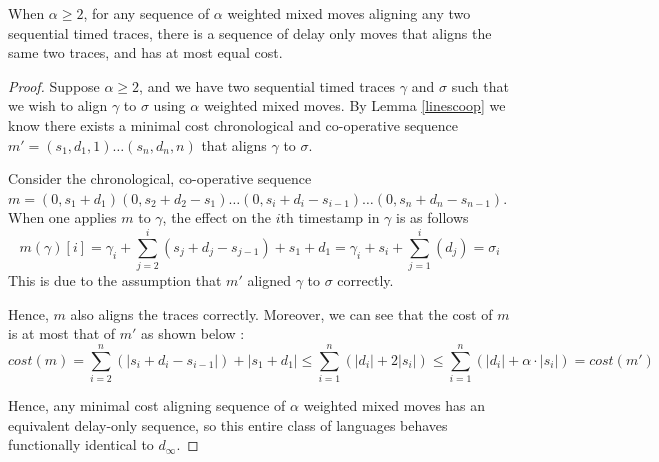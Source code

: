 \documentclass[runningheads]{llncs}
\begin{document}
\begin{lemma*} When $\alpha \geq 2$, for any sequence of $\alpha$ weighted mixed moves aligning any two sequential timed traces, there is a sequence of delay only moves that aligns the same two traces, and has at most equal cost. 
\end{lemma*}
\begin{proof}
	Suppose $\alpha \geq 2$, and we have two sequential timed traces $\gamma$ and $\sigma$ such that we wish to align $\gamma$ to $\sigma$ using $\alpha$ weighted mixed moves. 
	By Lemma \ref{linescoop} we know there exists a minimal cost chronological and co-operative sequence $m' = (s_1, d_1, 1) \dots (s_n, d_n, n)$ that aligns $\gamma$ to $\sigma$. 

	Consider the chronological, co-operative sequence $m = (0, s_1 + d_1)(0, s_2 + d_2 - s_1)\dots(0, s_i + d_i - s_{i-1})\dots (0, s_n + d_n - s_{n-1})$. 
	When one applies $m$ to $\gamma$, the effect on the $i$th timestamp in $\gamma$ is as follows $$m(\gamma)[i] = \gamma_i + \sum_{j = 2}^{i} (s_j + d_j - s_{j-1}) + s_1 + d_1 = \gamma_i + s_i + \sum_{j = 1}^{i} (d_j) = \sigma_i$$
This is due to the assumption that $m'$ aligned $\gamma$ to $\sigma$ correctly.

Hence, $m$ also aligns the traces correctly. Moreover, we can see that the cost of $m$ is at most that of $m'$ as shown below : 
$$cost(m) = \sum_{i=2}^{n} (|s_i + d_i - s_{i-1}|) + |s_1 + d_1| \leq \sum_{i=1}^{n} (|d_i| + 2|s_i|) \leq \sum_{i=1}^{n} (|d_i| + \alpha \cdot|s_i|) = cost(m')$$

Hence, any minimal cost aligning sequence of $\alpha$ weighted mixed moves has an equivalent delay-only sequence, so this entire class of languages behaves functionally identical to $d_{\infty}$. 
\end{proof}
\end{document}
